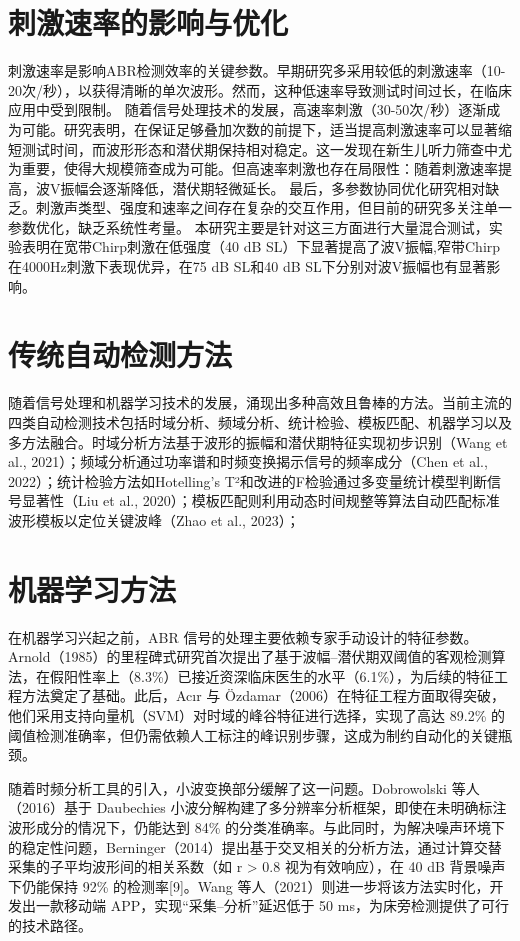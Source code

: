 \section{刺激速率的影响与优化}
刺激速率是影响ABR检测效率的关键参数。早期研究多采用较低的刺激速率（10-20次/秒），以获得清晰的单次波形。然而，这种低速率导致测试时间过长，在临床应用中受到限制。
随着信号处理技术的发展，高速率刺激（30-50次/秒）逐渐成为可能。研究表明，在保证足够叠加次数的前提下，适当提高刺激速率可以显著缩短测试时间，而波形形态和潜伏期保持相对稳定\cite{choi2013clinical}。这一发现在新生儿听力筛查中尤为重要，使得大规模筛查成为可能。但高速率刺激也存在局限性：随着刺激速率提高，波V振幅会逐渐降低，潜伏期轻微延长\cite{burkard2007auditory}。
最后，多参数协同优化研究相对缺乏。刺激声类型、强度和速率之间存在复杂的交互作用，但目前的研究多关注单一参数优化，缺乏系统性考量。 本研究主要是针对这三方面进行大量混合测试，实验表明在宽带Chirp刺激在低强度（40 dB SL）下显著提高了波V振幅,窄带Chirp在4000Hz刺激下表现优异，在75 dB SL和40 dB SL下分别对波V振幅也有显著影响。

\section{传统自动检测方法}
随着信号处理和机器学习技术的发展，涌现出多种高效且鲁棒的方法。当前主流的四类自动检测技术包括时域分析、频域分析、统计检验、模板匹配、机器学习以及多方法融合。时域分析方法基于波形的振幅和潜伏期特征实现初步识别（Wang et al., 2021）\cite{wang2021time}；频域分析通过功率谱和时频变换揭示信号的频率成分（Chen et al., 2022）\cite{chen2022frequency}；统计检验方法如Hotelling's T²和改进的F检验通过多变量统计模型判断信号显著性（Liu et al., 2020）\cite{liu2020statistical}；模板匹配则利用动态时间规整等算法自动匹配标准波形模板以定位关键波峰（Zhao et al., 2023）\cite{zhao2023template}；

\section{机器学习方法}
在机器学习兴起之前，ABR 信号的处理主要依赖专家手动设计的特征参数。Arnold（1985）的里程碑式研究首次提出了基于波幅–潜伏期双阈值的客观检测算法，在假阳性率上（8.3\%）已接近资深临床医生的水平（6.1\%），为后续的特征工程方法奠定了基础。此后，Acır 与 Özdamar（2006）\cite{acir2006automatic}在特征工程方面取得突破，他们采用支持向量机（SVM）对时域的峰谷特征进行选择，实现了高达 89.2\% 的阈值检测准确率，但仍需依赖人工标注的峰识别步骤，这成为制约自动化的关键瓶颈。

随着时频分析工具的引入，小波变换部分缓解了这一问题。Dobrowolski 等人（2016）\cite{dobrowolski2016classification}基于 Daubechies 小波分解构建了多分辨率分析框架，即使在未明确标注波形成分的情况下，仍能达到 84\% 的分类准确率。与此同时，为解决噪声环境下的稳定性问题，Berninger（2014）\cite{berninger2014analysis}提出基于交叉相关的分析方法，通过计算交替采集的子平均波形间的相关系数（如 r > 0.8 视为有效响应），在 40 dB 背景噪声下仍能保持 92\% 的检测率[9]。Wang 等人（2021）\cite{wang2021real}则进一步将该方法实时化，开发出一款移动端 APP，实现“采集–分析”延迟低于 50 ms，为床旁检测提供了可行的技术路径。

